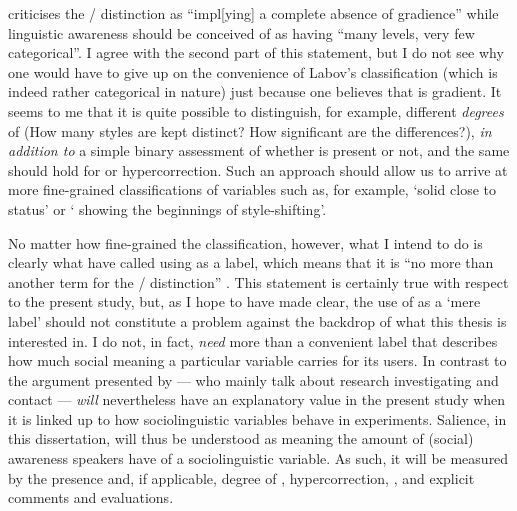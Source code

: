 \textcite[6]{racz2013} criticises the / distinction as ``impl[ying] a complete absence of gradience'' while linguistic awareness should be conceived of as having ``many levels, very few categorical''.
I agree with the second part of this statement, but I do not see why one would have to give up on the convenience of Labov's classification (which is indeed rather categorical in nature) just because one believes that  is gradient.
It seems to me that it is quite possible to distinguish, for example, different \emph{degrees} of  (How many styles are kept distinct? How significant are the differences?), \emph{in addition to} a simple binary assessment of whether  is present or not, and the same should hold for  or hypercorrection.
Such an approach should allow us to arrive at more fine-grained classifications of variables such as, for example, `solid  close to  status' or ` showing the beginnings of style-shifting'.

No matter how fine-grained the classification, however, what I intend to do is clearly what \textcite{kerswillwilliams2002} have called using \emph{} as a label, which means that it is ``no more than another term for the / distinction'' \parencite[32]{racz2013}.
This statement is certainly true with respect to the present study, but, as I hope to have made clear, the use of  as a `mere label' should not constitute a problem against the backdrop of what this thesis is interested in.
I do not, in fact, \emph{need} more than a convenient label that describes how much social meaning a particular variable carries for its users.
In contrast to the argument presented by \textcite{kerswillwilliams2002} --- who mainly talk about research investigating  and contact ---  \emph{will} nevertheless have an explanatory value in the present study when it is linked up to how sociolinguistic variables behave in  experiments.
Salience, in this dissertation, will thus be understood as meaning the amount of (social) awareness speakers have of a sociolinguistic variable.
As such, it will be measured by the presence and, if applicable, degree of , hypercorrection, , and explicit comments and evaluations.

